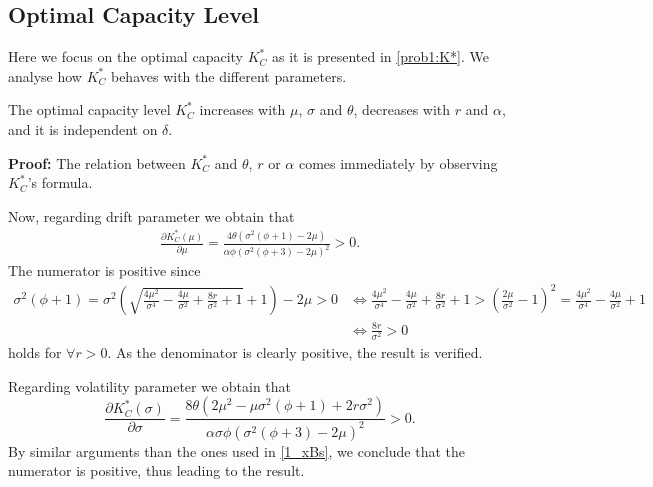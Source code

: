 \subsection{Optimal Capacity Level}

Here we focus on the optimal capacity $K^*_C$ as it is presented in \eqref{prob1:K*}. We analyse how $K_C^*$ behaves with the different parameters.

\begin{prop}
	\label{1_prop3}
The optimal capacity level $K^*_C$ increases with $\mu$, $\sigma$ and $\theta$, decreases with $r$ and $\alpha$, and it is independent on $\delta$.
\end{prop}


\textbf{Proof:}
The relation between $K^*_C$ and $\theta$, $r$ or $\alpha$ comes immediately by observing $K^*_C$'s formula.

Now, regarding drift parameter we obtain that
 \begin{align*}
\frac{\partial K^*_C(\mu)}{\partial \mu}=
\frac{4 \theta \left(\sigma ^2 \left(\phi+1\right)-2 \mu \right)}{\alpha \phi \left(\sigma ^2 \left(\phi+3\right)-2 \mu \right)^2}>0.
\end{align*}
The numerator is positive since
\begin{align}
\label{cond2}
\sigma ^2 (\phi+1)=\sigma ^2 \left(\sqrt{\frac{4 \mu ^2}{\sigma ^4}-\frac{4 \mu }{\sigma ^2}+\frac{8 r}{\sigma ^2}+1}+1\right)-2 \mu>0 
& \Leftrightarrow
\frac{4 \mu ^2}{\sigma ^4}-\frac{4 \mu }{\sigma ^2}+\frac{8 r}{\sigma ^2}+1 > \left( \frac{2 \mu}{\sigma^2}-1 \right)^2=\frac{4 \mu ^2}{\sigma ^4}-\frac{4 \mu }{\sigma ^2}+1 \nonumber\\
& \Leftrightarrow
\frac{8 r}{\sigma ^2}>0 \nonumber
\end{align}
holds for $\forall r> 0$. As the denominator is clearly positive, the result is verified.

Regarding volatility parameter we obtain that
\begin{equation*}
    \frac{\partial K^*_C(\sigma)}{\partial \sigma}= 
\frac{8 \theta \left(2 \mu ^2-\mu  \sigma ^2 \left( \phi+1 \right)+2 r \sigma ^2 \right)}{\alpha \sigma  \phi  \left( \sigma ^2 \left( \phi+3 \right)-2 \mu \right)^2}>0.
\end{equation*}
By similar arguments than the ones used in \eqref{1_xBs}, we conclude that the numerator is positive, thus leading to the result.

